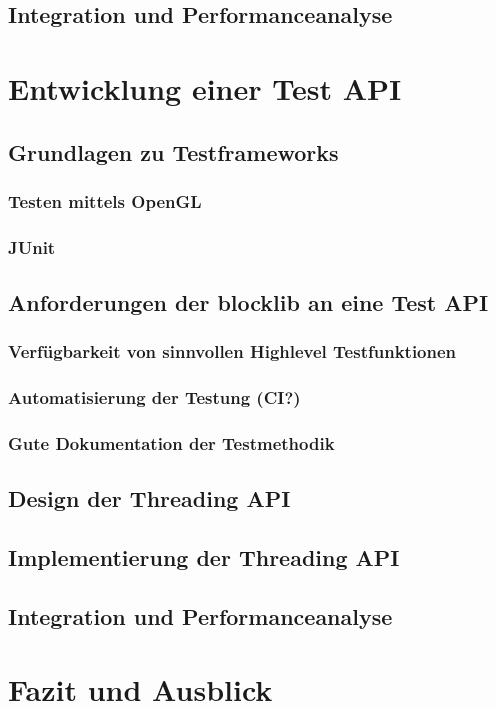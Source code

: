 \documentclass[parskip=half,twoside,BCOR=2cm,11pt,DIV=10]{scrreprt}
\begin{document}
\section{Integration und Performanceanalyse}

\chapter{Entwicklung einer Test API}
\section{Grundlagen zu Testframeworks}
\subsection{Testen mittels OpenGL}
\subsection{JUnit}
\section{Anforderungen der blocklib an eine Test API}
\subsection{Verfügbarkeit von sinnvollen Highlevel Testfunktionen}
\subsection{Automatisierung der Testung (CI?)}
\subsection{Gute Dokumentation der Testmethodik}
\section{Design der Threading API}
\section{Implementierung der Threading API}
\section{Integration und Performanceanalyse}

\chapter
{Fazit und Ausblick}
\end{document}

